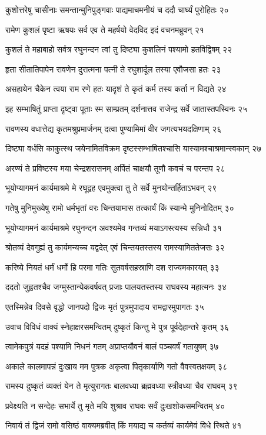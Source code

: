कुशोत्तरेषु चासीनाः समन्तान्मुनिपुङ्गवाः
पाद्यमाचमनीयं च ददौ चार्घ्यं पुरोहितः २०

रामेण कुशलं पृष्टा ऋषयः सर्व एव ते
महर्षयो वेदविद इदं वचनमब्रुवन् २१

कुशलं ते महाबाहो सर्वत्र रघुनन्दन
त्वां तु दिष्ट्या कुशलिनं पश्यामो हतविद्विषम् २२

हृता सीतातिपापेन रावणेन दुरात्मना
पत्नी ते रघुशार्दूल तस्या एवौजसा हतः २३

असहायेन चैकेन त्वया राम रणे हतः
यादृशं ते कृतं कर्म तस्य कर्ता न विद्यते २४

इह सम्भाषितुं प्राप्ता दृष्ट्वा पूताः स्म साम्प्रतम्
दर्शनात्तव राजेन्द्र सर्वे जातास्तपस्विनः २५

रावणस्य वधात्तेद्य कृतमश्रुप्रमार्जनम्
दत्वा पुण्यामिमां वीर जगत्यभयदक्षिणाम् २६

दिष्ट्या वर्धसि काकुत्स्थ जयेनामितविक्रम
दृष्टस्सम्भाषितश्चासि यास्यामश्चाश्रमान्स्वकान् २७

अरण्यं ते प्रविष्टस्य मया चेन्द्रशरासनम्
अर्पितं चाक्षयौ तूणौ कवचं च परन्तप २८

भूयोप्यागमनं कार्यमाश्रमे मे रघूद्वह
एवमुक्त्वा तु ते सर्वे मुनयोन्तर्हिताऽभवन् २९

गतेषु मुनिमुख्येषु रामो धर्मभृतां वरः
चिन्तयामास तत्कार्यं किं स्यान्मे मुनिनोदितम् ३०

भूयोप्यागमनं कार्यमाश्रमे रघुनन्दन
अवश्यमेव गन्तव्यं मयाऽगस्त्यस्य सन्निधौ ३१

श्रोतव्यं देवगुह्यं तु कार्यमन्यच्च यद्वदेत्
एवं चिन्तयतस्तस्य रामस्यामिततेजसः ३२

करिष्ये नियतं धर्मं धर्मो हि परमा गतिः
सुतवर्षसहस्राणि दश राज्यमकारयत् ३३

ददतो जुह्वतश्चैव जग्मुस्तान्येकवर्षवत्
प्रजाः पालयतस्तस्य राघवस्य महात्मनः ३४

एतस्मिन्नेव दिवसे वृद्धो जानपदो द्विजः
मृतं पुत्रमुपादाय रामद्वारमुपागतः ३५

उवाच विविधं वाक्यं स्नेहाक्षरसमन्वितम्
दुष्कृतं किन्तु मे पुत्र पूर्वदेहान्तरे कृतम् ३६

त्वामेकपुत्रं यदहं पश्यामि निधनं गतम्
अप्राप्तयौवनं बालं पञ्चवर्षं गतायुषम् ३७

अकाले कालमापन्नं दुःखाय मम पुत्रक
अकृत्वा पितृकार्याणि गतो वैवस्वतक्षयम् ३८

रामस्य दुष्कृतं व्यक्तं येन ते मृत्युरागतः
बालवध्या ब्रह्मवध्या स्त्रीवध्या चैव राघवम् ३९

प्रवेक्ष्यति न सन्देहः सभार्ये तु मृते मयि
शुश्राव राघवः सर्वं दुःखशोकसमन्वितम् ४०

निवार्य तं द्विजं रामो वसिष्ठं वाक्यमब्रवीत्
किं मयाद्य च कर्तव्यं कार्यमेवं विधे स्थिते ४१


